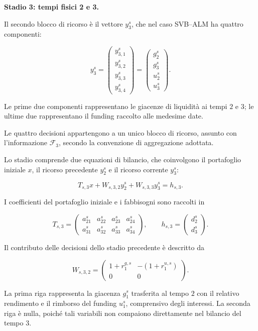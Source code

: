 \medskip

\noindent
\textbf{Stadio 3: tempi fisici 2 e 3.}

Il secondo blocco di ricorso \`e il vettore
$y_3^s$, che nel caso SVB--ALM ha quattro componenti:

\[
y_3^s
=
\begin{pmatrix}
y_{3,1}^s\\
y_{3,2}^s\\
y_{3,3}^s\\
y_{3,4}^s
\end{pmatrix}
=
\begin{pmatrix}
g_2^s\\
g_3^s\\
u_2^s\\
u_3^s
\end{pmatrix}.
\]

Le prime due componenti rappresentano
le giacenze di liquidit\`a ai tempi $2$ e $3$;
le ultime due rappresentano il funding
raccolto alle medesime date.

Le quattro decisioni appartengono a un unico
blocco di ricorso, assunto con l'informazione
$\mathcal F_3$, secondo la convenzione
di aggregazione adottata.

Lo stadio comprende due equazioni di bilancio,
che coinvolgono il portafoglio iniziale $x$,
il ricorso precedente $y_2^s$
e il ricorso corrente $y_3^s$:

\[
T_{s,3}x+
W_{s,3,2}y_2^s+
W_{s,3,3}y_3^s
=
h_{s,3}.
\]

I coefficienti del portafoglio iniziale
e i fabbisogni sono raccolti in

\[
T_{s,3}
=
\begin{pmatrix}
a_{21}^s&a_{22}^s&a_{23}^s&a_{24}^s\\
a_{31}^s&a_{32}^s&a_{33}^s&a_{34}^s
\end{pmatrix},
\qquad
h_{s,3}
=
\begin{pmatrix}
d_2^s\\
d_3^s
\end{pmatrix}.
\]

Il contributo delle decisioni
dello stadio precedente \`e descritto da

\[
W_{s,3,2}
=
\begin{pmatrix}
1+r_1^{g,s}&-(1+r_1^{u,s})\\
0&0
\end{pmatrix}.
\]

La prima riga rappresenta la giacenza
$g_1^s$ trasferita al tempo $2$
con il relativo rendimento e il rimborso
del funding $u_1^s$, comprensivo
degli interessi. La seconda riga
\`e nulla, poich\'e tali variabili
non compaiono direttamente nel bilancio
del tempo $3$.

